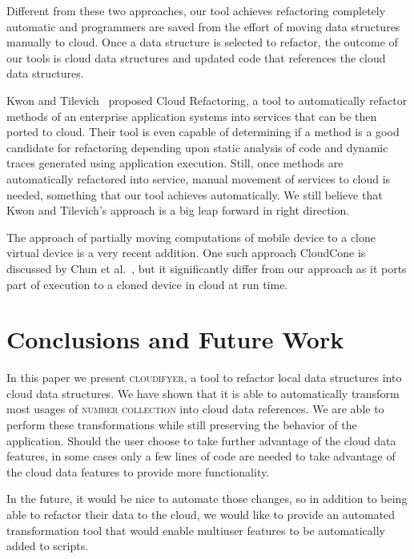 \documentclass{sigplanconf}
\begin{document}
Different from these two approaches, our tool achieves refactoring completely automatic and programmers are saved from the effort of moving data structures manually to cloud. Once a data structure is selected to refactor, the outcome of our tools is cloud data structures and updated code that references the cloud data structures.

Kwon and Tilevich~\cite{kwon2013cloud} proposed Cloud Refactoring, a tool to automatically refactor methods of an enterprise application systems into services that can be then ported to cloud. Their tool is even capable of determining if a method is a good candidate for refactoring depending upon static analysis of code and dynamic traces generated using application execution. Still, once methods are automatically refactored into service, manual movement of services to cloud is needed, something that our tool achieves automatically. We still believe that Kwon and Tilevich's approach is a big leap forward in right direction.  

The approach of partially moving computations of mobile device to a clone virtual device is a very recent addition. One such approach CloudCone is discussed by Chun et al.~\cite{chun2011clonecloud}, but it significantly differ from our approach as it ports part of execution to a cloned device in cloud at run time. 


\section{Conclusions and Future Work}
\label{sec:conclusions}
In this paper we present \textsc{cloudifyer}, a tool to refactor local data structures into cloud data structures.  We have shown that it is able to automatically transform most usages of \textsc{number collection} into cloud data references.  We are able to perform these transformations while still preserving the behavior of the application.  Should the user choose to take further advantage of the cloud data features, in some cases only a few lines of code are needed to take advantage of the cloud data features to provide more functionality. 

In the future, it would be nice to automate those changes, so in addition to being able to refactor their data to the cloud, we would like to provide an automated transformation tool that would enable multiuser features to be automatically added to scripts.










\end{document}

